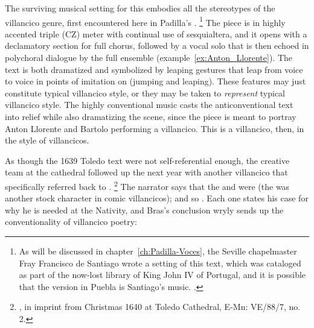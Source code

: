 The surviving musical setting for this  embodies all the stereotypes of the villancico genre, first encountered here in Padilla's .%
	\footnote{%
As will be discussed in chapter~\ref{ch:Padilla-Voces}, the Seville chapelmaster Fray Francisco de Santiago wrote a setting of this text, which was cataloged as part of the now-lost library of King John IV of Portugal, and it is possible that the version in Puebla is Santiago's music. \autocite[caixão 26, no. 675]{JohnIV:Catalog}.
	}
The piece is in highly accented triple (CZ) meter with continual use of sesquialtera, and it opens with a declamatory section for full chorus, followed by a vocal solo that is then echoed in polychoral dialogue by the full ensemble (example~\ref{ex:Anton_Llorente}).
The text is both dramatized and symbolized by leaping gestures that leap from voice to voice in points of imitation on  (jumping and leaping).
These features may just constitute typical villancico style, or they may be taken to \emph{represent} typical villancico style.
The highly conventional music casts the anticonventional text into relief while also dramatizing the scene, since the piece is meant to portray Anton Llorente and Bartolo performing a villancico.
This is a villancico, then, in the style of villancicos.

% 
As though the 1639 Toledo text were not self-referential enough, the creative team at the cathedral followed up the next year with another villancico that specifically referred back to .%
	\footnote{
	, in imprint from Christmas 1640 at Toledo Cathedral, E-Mn: VE/88/7, no. 2.
	}
The narrator says that the  and  were  (the  was another stock character in comic villancicos); and so .
Each one states his case for why he is needed at the Nativity, and Bras's conclusion wryly sends up the conventionality of villancico poetry:

